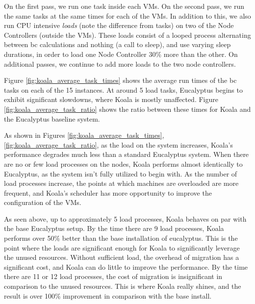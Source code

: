 On the first pass, we run one task inside each VMs.  On the second pass, we run the same tasks at the same times for each of the VMs.  In addition to this, we also run CPU intensive \emph{loads} (note the difference from tasks) on two of the Node Controllers (outside the VMs).  These loads consist of a looped process alternating between bc calculations and nothing (a call to sleep), and use varying sleep durations, in order to load one Node Controller 30\% more than the other.  On additional passes, we continue to add more loads to the two node controllers.

Figure \ref{fig:koala_average_task_times} shows the average run times of the bc tasks on each of the 15 instances.  At around 5 load tasks, Eucalyptus begins to exhibit significant slowdowns, where Koala is mostly unaffected.  Figure \ref{fig:koala_average_task_ratio} shows the ratio between these times for Koala and the Eucalyptus baseline system.

As shown in Figures \ref{fig:koala_average_task_times},\ref{fig:koala_average_task_ratio}, as the load on the system increases, Koala's performance degrades much less than a standard Eucalyptus system.  When there are no or few load processes on the nodes, Koala performs almost identically to Eucalyptus, as the system isn't fully utilized to begin with.  As the number of load processes increase, the points at which machines are overloaded are more frequent, and Koala's scheduler has more opportunity to improve the configuration of the VMs.

As seen above, up to approximately 5 load processes, Koala behaves on par with the base Eucalyptus setup.  By the time there are 9 load processes, Koala performs over 50\% better than the base installation of eucalyptus.  This is the point where the loads are significant enough for Koala to significantly leverage the unused resources.  Without sufficient load, the overhead of migration has a significant cost, and Koala can do little to improve the performance.  By the time there are 11 or 12 load processes, the cost of migration is insignificant in comparison to the unused resources.  This is where Koala really shines, and the result is over 100\% improvement in comparison with the base install.
